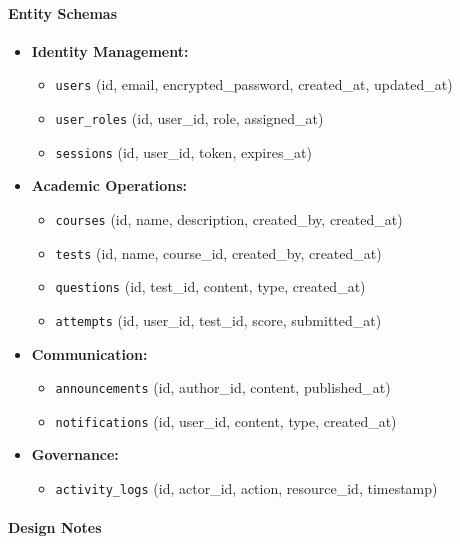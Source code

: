 \documentclass[11pt,a4paper]{article}
\begin{document}
\paragraph{Entity Schemas}

\begin{itemize}
    \item \textbf{Identity Management:}
    \begin{itemize}
        \item \texttt{users} (id, email, encrypted\_password, created\_at, updated\_at)
        \item \texttt{user\_roles} (id, user\_id, role, assigned\_at)
        \item \texttt{sessions} (id, user\_id, token, expires\_at)
    \end{itemize}

    \item \textbf{Academic Operations:}
    \begin{itemize}
        \item \texttt{courses} (id, name, description, created\_by, created\_at)
        \item \texttt{tests} (id, name, course\_id, created\_by, created\_at)
        \item \texttt{questions} (id, test\_id, content, type, created\_at)
        \item \texttt{attempts} (id, user\_id, test\_id, score, submitted\_at)
    \end{itemize}

    \item \textbf{Communication:}
    \begin{itemize}
        \item \texttt{announcements} (id, author\_id, content, published\_at)
        \item \texttt{notifications} (id, user\_id, content, type, created\_at)
    \end{itemize}

    \item \textbf{Governance:}
    \begin{itemize}
        \item \texttt{activity\_logs} (id, actor\_id, action, resource\_id, timestamp)
    \end{itemize}
\end{itemize}

\paragraph{Design Notes}
\end{document}
